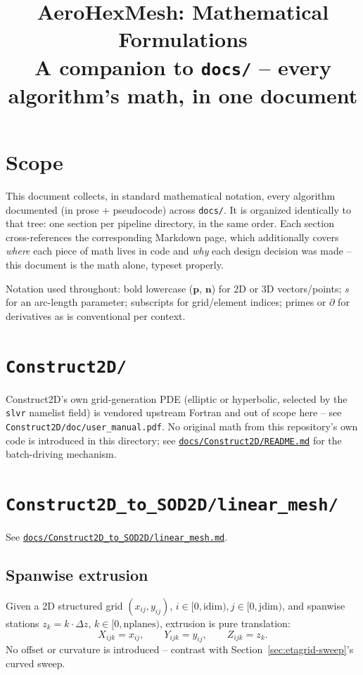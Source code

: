 \documentclass[11pt]{article}
\title{AeroHexMesh: Mathematical Formulations\\[0.3em]
\large A companion to \texttt{docs/} -- every algorithm's math, in one document}
\author{}
\date{}
\newcommand{\vecb}[1]{\bm{#1}}
\begin{document}
\maketitle
\tableofcontents

\section*{Scope}

This document collects, in standard mathematical notation, every
algorithm documented (in prose + pseudocode) across \texttt{docs/}. It
is organized identically to that tree: one section per pipeline
directory, in the same order. Each section cross-references the
corresponding Markdown page, which additionally covers \emph{where}
each piece of math lives in code and \emph{why} each design decision
was made -- this document is the math alone, typeset properly.

Notation used throughout: bold lowercase (\(\vecb{p}\), \(\vecb{n}\))
for 2D or 3D vectors/points; \(s\) for an arc-length parameter;
subscripts for grid/element indices; primes or \(\partial\) for
derivatives as is conventional per context.

\section{\texttt{Construct2D/}}
\label{sec:construct2d}
Construct2D's own grid-generation PDE (elliptic or hyperbolic,
selected by the \texttt{slvr} namelist field) is vendored upstream
Fortran and out of scope here -- see
\texttt{Construct2D/doc/user\_manual.pdf}. No original math from this
repository's own code is introduced in this directory; see
\href{https://github.com/kvishalrai/AeroHexMesh/blob/master/docs/Construct2D/README.md}{\texttt{docs/Construct2D/README.md}}
for the batch-driving mechanism.

\section{\texttt{Construct2D\_to\_SOD2D/linear\_mesh/}}
\label{sec:c2s-linear}
See \href{https://github.com/kvishalrai/AeroHexMesh/blob/master/docs/Construct2D_to_SOD2D/linear_mesh.md}{\texttt{docs/Construct2D\_to\_SOD2D/linear\_mesh.md}}.

\subsection{Spanwise extrusion}
Given a 2D structured grid \((x_{ij}, y_{ij})\), \(i \in [0,\text{idim}), j\in[0,\text{jdim})\),
and spanwise stations \(z_k = k \cdot \Delta z\), \(k \in [0, \text{nplanes})\),
extrusion is pure translation:
\begin{equation}
X_{ijk} = x_{ij}, \qquad Y_{ijk} = y_{ij}, \qquad Z_{ijk} = z_k .
\end{equation}
No offset or curvature is introduced -- contrast with
Section~\ref{sec:etagrid-sweep}'s curved sweep.
\end{document}
